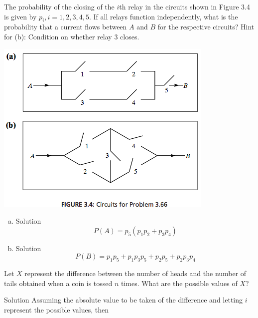 \documentclass{article}
\begin{document}
\begin{spacing}{1.1}
\maketitle

\newpage
\begin{homeworkProblem}
The probability of the closing of the $i$th relay in the circuits 
shown in Figure 3.4 is given by $p_i, i = 1, 2, 3, 4, 5$. If all 
relays function independently, what is the probability that a 
current flows between $A$ and $B$ for the respective circuits?
Hint for (b): Condition on whether relay 3 closes.

\includegraphics{p108_66}
  \begin{enumerate}[(a)]
    \item
      \begin{homeworkSection}{Solution}
        \[P(A) = p_5 (p_1 p_2 + p_3 p_4)\]
      \end{homeworkSection}
    \item
      \begin{homeworkSection}{Solution}
        \[P(B) = p_1 p_5 + p_1 p_3 p_5 + p_2 p_5 + p_2 p_3 p_4\]
      \end{homeworkSection}
  \end{enumerate}
\end{homeworkProblem}
\newpage
\begin{homeworkProblem}
  Let $X$ represent the difference between the number of heads
  and the number of tails obtained when a coin is tossed $n$ times. 
  What are the possible values of $X$?
  \begin{homeworkSection}{Solution}
    Assuming the absolute value to be taken of the difference and
    letting $i$ represent the possible values, then 


\end{homeworkSection}
\end{homeworkProblem}
\end{spacing}
\end{document}
